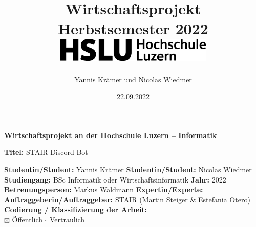 \documentclass[a4paper]{article}
\title{
    {Wirtschaftsprojekt} \\
    \vspace{10mm}
    { Herbstsemester 2022 } \\
    \vspace{10mm}
    {\includegraphics[width=75mm]{img/hsluLogo2022.png}}
}
\author{Yannis Krämer und Nicolas Wiedmer}
\date{22.09.2022}
\begin{document}
\maketitle

\newpage

\noindent
\fontsize{12}{14}
\textbf{Wirtschaftsprojekt an der Hochschule Luzern -- Informatik} \\ \vspace*{0.6cm}

\fontsize{10.95}{12}
\noindent
\textbf{Titel:} STAIR Discord Bot \\ \vspace*{0.2cm}

\noindent
\textbf{Studentin/Student:} Yannis Krämer \newline \newline
\textbf{Studentin/Student:} Nicolas Wiedmer \newline \newline
\textbf{Studiengang:} BSc Informatik oder Wirtschaftsinformatik  \newline \newline
\textbf{Jahr:} 2022 \newline \newline
\textbf{Betreuungsperson:} Markus Waldmann \newline \newline
\textbf{Expertin/Experte:} \newline \newline
\textbf{Auftraggeberin/Auftraggeber:} STAIR (Martin Steiger \& Estefania Otero)\newline \newline \newline
\textbf{Codierung / Klassifizierung der Arbeit:}\\
$\boxtimes$ \"Offentlich 
$\square$ Vertraulich


\end{document}

